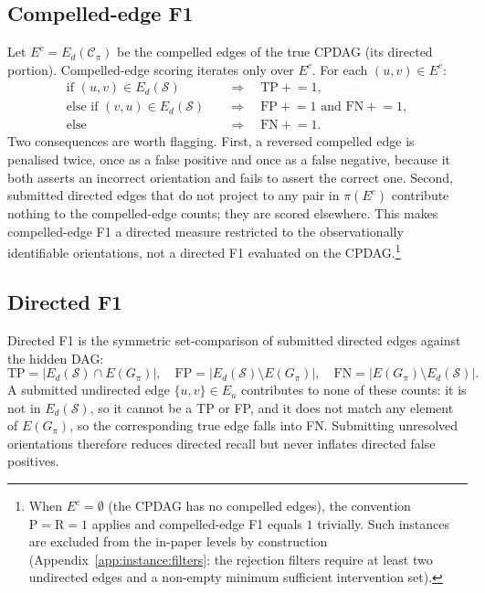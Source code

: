 \subsection{Compelled-edge F1}
\label{app:scoring:compelled}

Let $E^c = E_d(\mathcal{C}_\pi)$ be the compelled edges of the true CPDAG (its directed portion). Compelled-edge scoring iterates only over $E^c$. For each $(u, v) \in E^c$:
\begin{equation}
\begin{aligned}
\text{if } (u, v) \in E_d(\mathcal{S}) &\quad \Rightarrow \quad \mathrm{TP} \mathrel{+}= 1, \\
\text{else if } (v, u) \in E_d(\mathcal{S}) &\quad \Rightarrow \quad \mathrm{FP} \mathrel{+}= 1 \text{ and } \mathrm{FN} \mathrel{+}= 1, \\
\text{else} &\quad \Rightarrow \quad \mathrm{FN} \mathrel{+}= 1.
\end{aligned}
\end{equation}
Two consequences are worth flagging. First, a reversed compelled edge is penalised twice, once as a false positive and once as a false negative, because it both asserts an incorrect orientation and fails to assert the correct one. Second, submitted directed edges that do not project to any pair in $\pi(E^c)$ contribute nothing to the compelled-edge counts; they are scored elsewhere. This makes compelled-edge F1 a directed measure restricted to the observationally identifiable orientations, not a directed F1 evaluated on the CPDAG.\footnote{When $E^c = \emptyset$ (the CPDAG has no compelled edges), the convention $\mathrm{P} = \mathrm{R} = 1$ applies and compelled-edge F1 equals $1$ trivially. Such instances are excluded from the in-paper levels by construction (Appendix~\ref{app:instance:filters}: the rejection filters require at least two undirected edges and a non-empty minimum sufficient intervention set).}

\subsection{Directed F1}
\label{app:scoring:directed}

Directed F1 is the symmetric set-comparison of submitted directed edges against the hidden DAG:
\begin{equation}
\mathrm{TP} = |E_d(\mathcal{S}) \cap E(G_\pi)|, \quad
\mathrm{FP} = |E_d(\mathcal{S}) \setminus E(G_\pi)|, \quad
\mathrm{FN} = |E(G_\pi) \setminus E_d(\mathcal{S})|.
\end{equation}
A submitted undirected edge $\{u, v\} \in E_u$ contributes to none of these counts: it is not in $E_d(\mathcal{S})$, so it cannot be a TP or FP, and it does not match any element of $E(G_\pi)$, so the corresponding true edge falls into FN. Submitting unresolved orientations therefore reduces directed recall but never inflates directed false positives.

